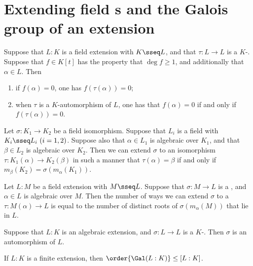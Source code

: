 \documentclass{article}
\begin{document}
\section{Extending field \homo s and the Galois group of an extension}
  \begin{tproposition}
    Suppose that \( L:K \) is a field extension with \( K\sseq L \), and that \( \tau:L\to L \) is a \( K \)-\homo. Suppose that \( f\in K[t] \) has the property that \( \deg f\geq 1 \), and additionally that \( \alpha\in L \). Then
    \begin{enumerate}[label=(\roman*)]
      \item if \( f(\alpha)=0 \), one has \( f(\tau(\alpha))=0 \);
      \item when \( \tau \) is a \( K \)-automorphism of \( L \), one has that \( f(\alpha)=0 \) if and only if \( f(\tau(\alpha))=0 \).
    \end{enumerate}
  \end{tproposition}

  \begin{ttheorem}
    Let \( \sigma:K_1\to K_2 \) be a field isomorphism. Suppose that \( L_i \) is a field with \( K_i\sseq L_i\ (i=1,2) \). Suppose also that \( \alpha\in L_1 \) is algebraic over \( K_1 \), and that \( \beta\in L_2 \) is algebraic over \( K_2 \). Then we can extend \( \sigma \) to an isomorphism \( \tau:K_1(\alpha)\to K_2(\beta) \) in such a manner that \( \tau(\alpha)=\beta \) if and only if \( m_\beta(K_2)=\sigma(m_\alpha(K_1)) \).
  \end{ttheorem}

  \begin{tcorollary}
    Let \( L:M \) be a field extension with \( M\sseq L \). Suppose that \( \sigma:M\to L \) is a \homo, and \( \alpha\in L \) is algebraic over \( M \). Then the number of ways we can extend \( \sigma \) to a \homo~\( \tau:M(\alpha)\to L \) is equal to the number of distinct roots of \( \sigma(m_\alpha(M)) \) that lie in \( L \).
  \end{tcorollary}

  \begin{ttheorem}
    Suppose that \( L:K \) is an algebraic extension, and \( \sigma:L\to L \) is a \( K \)-\homo. Then \( \sigma \) is an automorphism of \( L \).
  \end{ttheorem}

  \begin{ttheorem}
    If \( L:K \) is a finite extension, then \( \order{\Gal(L:K)}\leq [L:K] \).
  \end{ttheorem}
\end{document}
